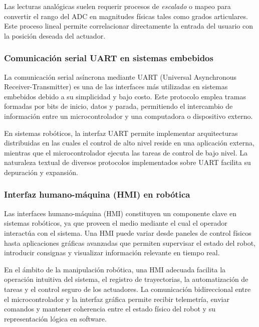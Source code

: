 \vspace{1em}

Las lecturas analógicas suelen requerir procesos de \emph{escalado} o mapeo para convertir el rango del ADC en magnitudes físicas tales como grados articulares. Este proceso lineal permite correlacionar directamente la entrada del usuario con la posición deseada del actuador.

\subsubsection{Comunicación serial UART en sistemas embebidos}

La comunicación serial asíncrona mediante UART (Universal Asynchronous Receiver-Transmitter) es una de las interfaces más utilizadas en sistemas embebidos debido a su simplicidad y bajo costo. Este protocolo emplea tramas formadas por bits de inicio, datos y parada, permitiendo el intercambio de información entre un microcontrolador y una computadora o dispositivo externo.

\vspace{1em}

En sistemas robóticos, la interfaz UART permite implementar arquitecturas distribuidas en las cuales el control de alto nivel reside en una aplicación externa, mientras que el microcontrolador ejecuta las tareas de control de bajo nivel. La naturaleza textual de diversos protocolos implementados sobre UART facilita su depuración y expansión.

\subsubsection{Interfaz humano-máquina (HMI) en robótica}

Las interfaces humano-máquina (HMI) constituyen un componente clave en sistemas robóticos, ya que proveen el medio mediante el cual el operador interactúa con el sistema. Una HMI puede variar desde paneles de control físicos hasta aplicaciones gráficas avanzadas que permiten supervisar el estado del robot, introducir consignas y visualizar información relevante en tiempo real.

\vspace{1em}

En el ámbito de la manipulación robótica, una HMI adecuada facilita la operación intuitiva del sistema, el registro de trayectorias, la automatización de tareas y el control seguro de los actuadores. La comunicación bidireccional entre el microcontrolador y la interfaz gráfica permite recibir telemetría, enviar comandos y mantener coherencia entre el estado físico del robot y su representación lógica en software.

